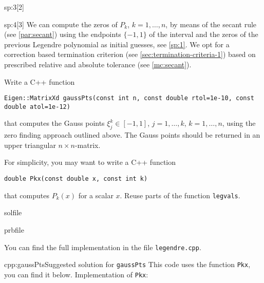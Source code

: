 \begin{samproblem}
\begin{subproblem}{sp:3}[2]
\end{subproblem}

\begin{subproblem}{sp:4}[3]
  We can compute the zeros of $P_k$, $k=1,\dots,n$, by means of the secant rule (see \cref{par:secant}) using the endpoints 
  $\{-1,1\}$ of the interval and the zeros of the previous Legendre polynomial as initial guesses, see \ref{sp:1}. 
  We opt for a correction based termination criterion (see \cref{sec:termination-criteria-1}) based on prescribed relative and 
  absolute tolerance (see \cref{mc:secant}).

  Write a C++ function
  \begin{lstlisting}[style=cpp]
Eigen::MatrixXd gaussPts(const int n, const double rtol=1e-10, const double atol=1e-12)
  \end{lstlisting}
  that computes the Gauss points $\xi^k_j\in [-1,1]$, $j=1,\dots,k$, $k=1,\dots,n$, using the zero finding approach outlined above. 
  The Gauss points should be returned in  an upper triangular $n\times n$-matrix.

  \begin{samhint}
    For simplicity, you may want to write a C++ function
    \begin{lstlisting}[style=cpp]
double Pkx(const double x, const int k)
    \end{lstlisting}
    that computes $P_k(x)$ for a scalar $x$. Reuse parts of the function \texttt{legvals}.
  \end{samhint}

  \begin{samwriteprbpart}{solfile}
    \begin{writeverbatim}{prbfile}
      \begin{samsolution}
        You can find the full implementation in the file \texttt{legendre.cpp}.
        \begin{samcode}[C++-code]{cpp:gaussPts}{Suggested solution for \texttt{gaussPts}}
          This code uses the function \texttt{Pkx}, you can find it below.
          Implementation of \texttt{Pkx}:
        \end{samcode}
      \end{samsolution}
    \end{writeverbatim}
  \end{samwriteprbpart}


\end{subproblem}
\end{samproblem}
